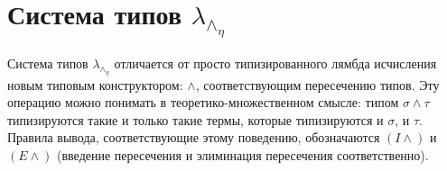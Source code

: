 \documentclass{spbau-diploma}
\begin{document}


\maketitle
\tableofcontents


\section{Система типов $\lambda_\wedge_\eta$}

Система типов $\lambda_\wedge_\eta$ отличается от просто типизированного лямбда исчисления новым типовым конструктором: $\wedge$, соответствующим пересечению типов. Эту операцию можно понимать в теоретико-множественном смысле: типом $\sigma \wedge \tau$ типизируются такие и только такие термы, которые типизируются и $\sigma$, и $\tau$. Правила вывода, соответствующие этому поведению, обозначаются $(I\wedge)$ и $(E\wedge)$ (введение пересечения и элиминация пересечения соответственно). 
\end{document}
